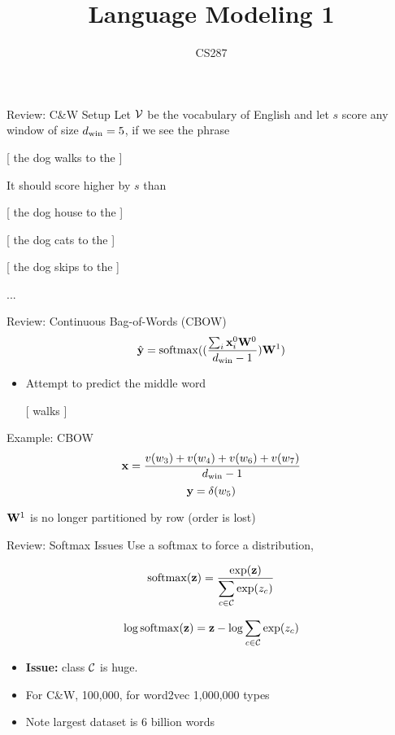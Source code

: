 \documentclass{beamer}
\title{Language Modeling 1}
\date{}
\author{CS287}
\begin{document}
\begin{frame}
  \titlepage
\end{frame}

\begin{frame}{Review: C\&W Setup}
  Let $\mathcal{V}$ be the vocabulary of English and let $s$
  score any window of size ${d_{\mathrm{win}}} =5$, if we see the phrase

  \begin{center}
  [ the dog walks to the ]
  \end{center}



  It should score higher by $s$ than
  \begin {center}
  [ the dog \alert{house} to the ]

   [ the dog \alert{cats} to the ]

   [ the dog \alert{skips} to the ]

   ...
  \end{center}
\end{frame}


\begin{frame}{Review: Continuous Bag-of-Words (CBOW) }
  \[\hat{\boldy} = \softmax((\frac{\sum_{i} \boldx_i^0 \boldW^0}{\dwin-1})\boldW^1)\]
  \begin{itemize}

  \item Attempt to predict the middle word
    \begin{center}
      [  \alert{walks}  ]
    \end{center}
  \end{itemize}

  Example: CBOW
  \[ \mathbf{x} = \frac{v(w_3) +  v(w_4) +   v(w_6) + v(w_7)}{{d_{\mathrm{win}}}-1}  \]
  \[ \mathbf{y} = \delta(w_5) \]


  $\mathbf{W}^1$ is no longer partitioned by row (order is lost)
\end{frame}

\begin{frame}{Review: Softmax Issues}
  Use a softmax to force a distribution,

  \[\softmax(\boldz) = \frac{\exp(\boldz)}{\displaystyle \sum_{c\in \mcC } \exp(z_c)}  \]

  \[\log \softmax(\boldz) = \boldz - \log \sum_{c\in \mcC} \exp(z_c)  \]

  \begin{itemize}
  \item \textbf{Issue:} class $\mathcal{C}$ is huge.
  \item For C\&W, 100,000, for word2vec 1,000,000 types
  \item Note largest dataset is 6 billion words
  \end{itemize}

\end{frame}
\end{document}
